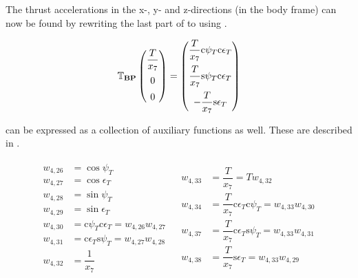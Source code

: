 \noindent
The thrust accelerations in the x-, y- and z-directions (in the body frame) can now be found by rewriting the last part of  to  using .

\begin{equation} \label{eq:aTB}
\mathbb{T}_{\mathbf{BP}}
\begin{pmatrix}
\dfrac{T}{x_{7}} \vspace{5pt} \\ \vspace{5pt}
0\\
0\\
\end{pmatrix}
=
\begin{pmatrix}
\dfrac{T}{x_{7}}\text{c}\psi_{T}\text{c}\epsilon_{T} \vspace{5pt} \\ \vspace{5pt}
\dfrac{T}{x_{7}}\text{s}\psi_{T}\text{c}\epsilon_{T}\\
-\dfrac{T}{x_{7}}\text{s}\epsilon_{T}\\
\end{pmatrix}
\end{equation}


\noindent
{} can be expressed as a collection of auxiliary functions as well. These are described in .

\begin{align} \label{eq:aTBAuxF}
\begin{split}
w_{4,26} &= \cos \psi_{T} \\
w_{4,27} &= \cos \epsilon_{T} \\
w_{4,28} &= \sin \psi_{T} \\
w_{4,29} &= \sin \epsilon_{T} \\
w_{4,30} &= \text{c}\psi_{T} \text{c}\epsilon_{T} = w_{4,26}w_{4,27} \\
w_{4,31} &= \text{c}\epsilon_{T} \text{s}\psi_{T} = w_{4,27}w_{4,28} \\
w_{4,32} &= \dfrac{1}{x_{7}}\\
\end{split}
&
\begin{split}
w_{4,33} &= \dfrac{T}{x_{7}} = T w_{4,32}\\
w_{4,34} &= \dfrac{T}{x_{7}} \text{c}\epsilon_{T} \text{c}\psi_{T} = w_{4,33}w_{4,30} \\
w_{4,37} &= \dfrac{T}{x_{7}}\text{c}\epsilon_{T} \text{s}\psi_{T} = w_{4,33}w_{4,31} \\
w_{4,38} &= \dfrac{T}{x_{7}} \text{s}\epsilon_{T} = w_{4,33}w_{4,29} \\
\end{split}
\end{align}

